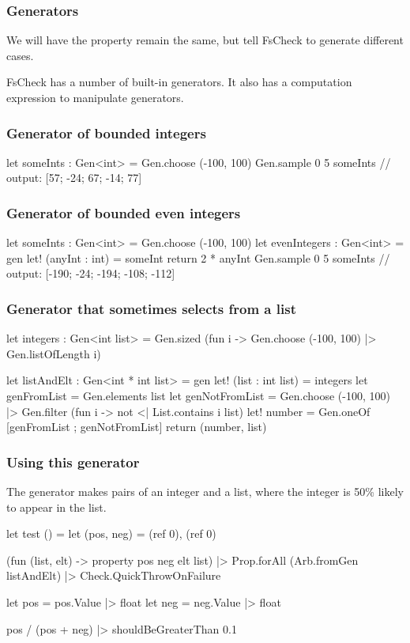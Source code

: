 \documentclass{beamer}
\begin{document}
\begin{frame}[fragile]
\frametitle{Generators}
We will have the property remain the same, but tell FsCheck to generate different cases.

FsCheck has a number of built-in generators.
It also has a computation expression to manipulate generators.
\end{frame}

\begin{frame}[fragile]
\frametitle{Generator of bounded integers}

\begin{fslisting}
let someInts : Gen<int> = Gen.choose (-100, 100)
Gen.sample 0 5 someInts
// output: [57; -24; 67; -14; 77]
\end{fslisting}
\end{frame}

\begin{frame}[fragile]
\frametitle{Generator of bounded even integers}
\begin{fslisting}
let someInts : Gen<int> = Gen.choose (-100, 100)
let evenIntegers : Gen<int> = gen {
    let! (anyInt : int) = someInt
    return 2 * anyInt
}
Gen.sample 0 5 someInts
// output: [-190; -24; -194; -108; -112]
\end{fslisting}
\end{frame}

\begin{frame}[fragile]
\frametitle{Generator that sometimes selects from a list}
\begin{fslisting}
let integers : Gen<int list> =
    Gen.sized (fun i ->
        Gen.choose (-100, 100)
        |> Gen.listOfLength i)

let listAndElt : Gen<int * int list> = gen {
    let! (list : int list) = integers
    let genFromList = Gen.elements list
    let genNotFromList =
        Gen.choose (-100, 100)
        |> Gen.filter (fun i -> not <| List.contains i list)
    let! number = Gen.oneOf [genFromList ; genNotFromList]
    return (number, list)
}
\end{fslisting}
\end{frame}

\begin{frame}[fragile]
\frametitle{Using this generator}

The generator makes pairs of an integer and a list, where the integer is 50\% likely to appear in the list.

\begin{fslisting}
[<Test>]
let test () =
    let (pos, neg) = (ref 0), (ref 0)

    (fun (list, elt) -> property pos neg elt list)
    |> Prop.forAll (Arb.fromGen listAndElt)
    |> Check.QuickThrowOnFailure

    let pos = pos.Value |> float
    let neg = neg.Value |> float

    pos / (pos + neg)
    |> shouldBeGreaterThan 0.1
\end{fslisting}
\end{frame}
\end{document}
